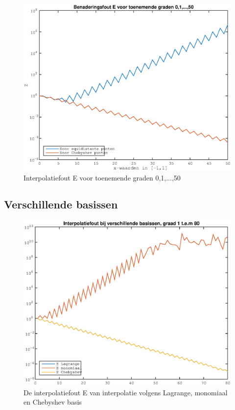 \documentclass{article}
\begin{document}
\begin{center}
\begin{figure}[h!]
\includegraphics[width=0.75\columnwidth]{benaderingsfout_interpolatiepunten}
\caption{Interpolatiefout E voor toenemende graden 0,1,...,50} %
\end{figure}
\end{center}


\subsection{Verschillende basissen}


\begin{center}
\begin{figure}[h!]
\includegraphics[width=0.75\columnwidth]{verschillende_basissen}
\caption{De interpolatiefout E van interpolatie volgens Lagrange, monomiaal en Chebyshev basis} %
\end{figure}
\end{center}
\end{document}
